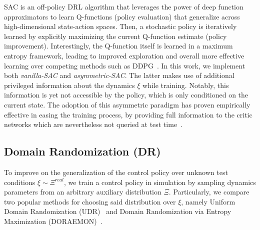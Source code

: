 SAC is an off-policy DRL algorithm
that leverages the power of deep function approximators to learn Q-functions (policy evaluation) that generalize across high-dimensional state-action spaces. Then, a stochastic policy is iteratively learned by explicitly maximizing the current Q-function estimate (policy improvement). 
Interestingly, the Q-function itself is learned in a maximum entropy framework, leading to improved exploration and overall more effective learning over competing methods such as DDPG~\citep{haarnoja2018soft}. In this work, we implement both \emph{vanilla-SAC} and \emph{asymmetric-SAC}. The latter makes use of additional privileged information about the dynamics \( \xi \) while training. Notably, this information is yet not accessible by the policy, which is only conditioned on the current state.
The adoption of this asymmetric paradigm has proven empirically effective in easing the training process, by providing full information to the critic networks which are nevertheless not queried at test time~\citep{akkaya2019solving}.

\subsection{Domain Randomization (DR)}
To improve on the generalization of the control policy over unknown test conditions $\xi \sim \Xi^{real} $, we train a control policy in simulation by sampling dynamics parameters from an arbitrary auxiliary distribution $\Xi$. Particularly, we compare two popular methods for choosing said distribution over $\xi$, namely Uniform Domain Randomization (UDR)~\citep{tobin2017domain, sadeghi2016cad2rl} and Domain Randomization via Entropy Maximization (DORAEMON)~\citep{tiboni2023domain}.

